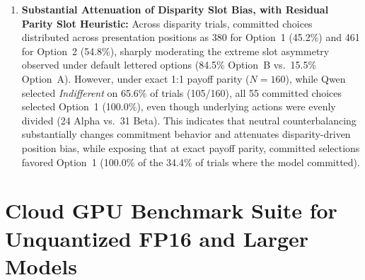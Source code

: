 \documentclass[10pt,journal,compsoc]{IEEEtran}
\begin{document}
\begin{enumerate}[leftmargin=*]
\item \textbf{Substantial Attenuation of Disparity Slot Bias, with Residual Parity Slot Heuristic:} Across disparity trials, committed choices distributed across presentation positions as 380 for Option~1 (45.2\%) and 461 for Option~2 (54.8\%), sharply moderating the extreme slot asymmetry observed under default lettered options (84.5\% Option~B vs.\ 15.5\% Option~A). However, under exact 1:1 payoff parity ($N=160$), while Qwen selected \textit{Indifferent} on 65.6\% of trials (105/160), all 55 committed choices selected Option~1 (100.0\%), even though underlying actions were evenly divided (24 Alpha vs.\ 31 Beta). This indicates that neutral counterbalancing substantially changes commitment behavior and attenuates disparity-driven position bias, while exposing that at exact payoff parity, committed selections favored Option~1 (100.0\% of the 34.4\% of trials where the model committed).
\end{enumerate}

\section{Cloud GPU Benchmark Suite for Unquantized FP16 and Larger Models}
\end{document}
